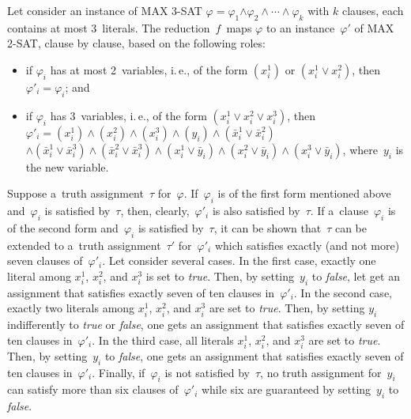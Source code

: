 \begin{multicols}{2}
\noindent
Let consider an instance of MAX 3-SAT $\varphi = \varphi_1$\linebreak $
\wedge \varphi_2 \wedge\cdots\wedge \varphi_k$ with $k$ clauses, each contains
at most 3~literals. The reduction~$f$~maps $\varphi$ to an instance~$\varphi'$ of MAX 2-SAT, clause by clause, based on the
following roles:
\begin{itemize}
\item if $\varphi_i$ has at most 2~variables, i.\,e., of
the form $(x^{1}_{i})$ or $(x^{1}_{i} \vee x^{2}_{i})$, then
$\varphi'_{i} =
\varphi_i$; and
\item if $\varphi_i$ has 3~variables, i.\,e., of the form
$(x^{1}_{i}\vee x^{2}_{i}\vee x^{3}_{i})$, then $\varphi'_{i} =
(x^{1}_{i}) \wedge (x^{2}_{i}) \wedge (x^{3}_{i}) \wedge (y_{i})
\wedge
  (\bar{x}^{1}_{i} \vee \bar{x}^{2}_{i})$\linebreak $ \wedge (\bar{x}^{1}_{i} \vee
\bar{x}^{3}_{i}) \wedge
  (\bar{x}^{2}_{i} \vee \bar{x}^{3}_{i}) \wedge (x^{1}_{i} \vee \bar{y}_{i})
\wedge (x^{2}_{i} \vee
  \bar{y}_{i}) \wedge (x^{3}_{i} \vee \bar{y}_{i})$, where~$y_i$ is the new
  variable.
  \end{itemize}

Suppose a~truth assignment~$\tau$ for~$\varphi$. If~$\varphi_i$ is
of the first form mentioned above and~$\varphi_i$ is satisfied by~$\tau$,
then, clearly,~$\varphi'_i$ is also satisfied by~$\tau$. If a~clause~$\varphi_i$ is of the second
form and~$\varphi_i$ is
satisfied by~$\tau$, it can be shown that~$\tau$ can be extended to
a~truth assignment~$\tau'$ for~$\varphi'_i$ which satisfies exactly
(and not more) seven clauses of~$\varphi'_i$. Let consider several
cases. In the first case, exactly one literal among $x^{1}_{i}$,
$x^{2}_{i}$, and $x^{3}_{i}$ is set to \textit{true}.
Then, by setting~$y_i$ to \textit{false}, let get an assignment that satisfies exactly
seven of ten clauses in~$\varphi'_i$. In the second case, exactly
two literals among $x^{1}_{i}$, $x^{2}_{i}$, and $x^{3}_{i}$ are set to
\textit{true}. Then, by setting $y_i$ indifferently to \textit{true}
or \textit{false}, one gets an assignment that satisfies exactly seven
of ten clauses in~$\varphi'_i$. In the third case, all literals
$x^{1}_{i}$, $x^{2}_{i}$, and $x^{3}_{i}$ are set to \textit{true}. Then, by
setting~$y_i$ to \textit{false}, one gets an assignment that satisfies
exactly seven of ten clauses in~$\varphi'_i$. Finally, if~$\varphi_i$ is not satisfied by~$\tau$, no truth assignment for~$y_i$ can satisfy more than six clauses of~$\varphi'_i$ while six
are guaranteed by setting~$y_i$ to \textit{false}.


\end{multicols}
